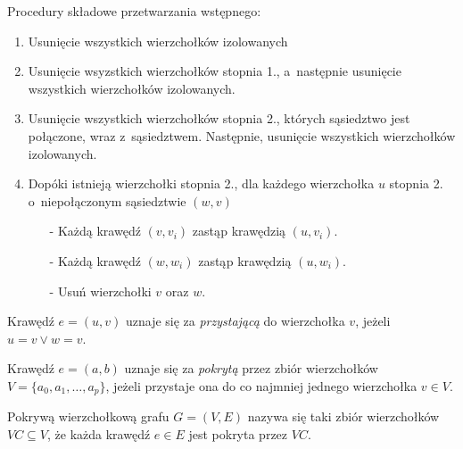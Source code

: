   Procedury składowe przetwarzania wstępnego:
  \begin{enumerate}
    \item Usunięcie wszystkich wierzchołków izolowanych
    \item Usunięcie wsyzstkich wierzchołków stopnia 1., a~następnie usunięcie
      wszystkich wierzchołków izolowanych.
    \item Usunięcie wszystkich wierzchołków stopnia 2., których sąsiedztwo jest
      połączone, wraz z~sąsiedztwem. Następnie, usunięcie wszystkich
      wierzchołków izolowanych.
    \item Dopóki istnieją wierzchołki stopnia 2., dla każdego wierzchołka $u$ 
      stopnia 2. o~niepołączonym sąsiedztwie $(w,v)$
      \begin{itemize}
        \item[-] Każdą krawędź $(v,v_i)$ zastąp krawędzią $(u, v_i)$.
        \item[-] Każdą krawędź $(w,w_i)$ zastąp krawędzią $(u, w_i)$.
        \item[-] Usuń wierzchołki $v$ oraz $w$.
      \end{itemize}
  \end{enumerate}

  \begin{lemma}
    Krawędź $e=(u,v)$ uznaje się za \emph{przystającą} do wierzchołka $v$,
    jeżeli $u=v \lor w=v$.
  \end{lemma}

  \begin{lemma}
    Krawędź $e=(a,b)$ uznaje się za \emph{pokrytą} przez zbiór wierzchołków \\
    $V=\{a_0, a_1, \ldots, a_p\}$, jeżeli przystaje ona do co najmniej jednego
    wierzchołka $v \in V$.
  \end{lemma}

  \begin{lemma}
    Pokrywą wierzchołkową grafu $G=(V,E)$ nazywa się taki zbiór wierzchołków
    $VC \subseteq V$, że każda krawędź $e \in E$ jest pokryta przez $VC$.
  \end{lemma}

